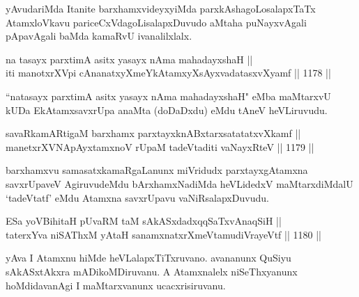 \begin{artha}
yAvudariMda Itanite barxhamxvideyxyiMda parxkAshagoLosalapxTaTx AtamxloVkavu pariceCxVdagoLisalapxDuvudo aMtaha puNayxvAgali pApavAgali baMda kamaRvU ivanalilxlalx.
\end{artha}


\begin{shl}
na tasayx parxtimA asitx yasayx nAma mahadayxshaH || \\
iti manotxrXV\s pi cA\s \s nanatxyXmeYkAtamxyXsAyxvadatasxvXyamf \hfill || 1178 ||  
\end{shl}

\begin{artha}
``natasayx parxtimA asitx yasayx nAma mahadayxshaH" eMba maMtarxvU kUDa EkAtamxsavxrUpa anaMta (doDaDxdu) eMdu tAneV heVLiruvudu.
\end{artha}

\begin{shl}
savaRkamARtigaM barxhamx parxtayxknABxtarxsatatatxvXkamf || \\
manetxrXVNApAyxtamxnoV rUpaM tadeVtaditi vaNayxRteV \hfill || 1179 ||  
\end{shl}

\begin{artha}
barxhamxvu samasatxkamaRgaLanunx miVridudx parxtayxgAtamxna savxrUpaveV AgiruvudeMdu bArxhamxNadiMda heVLidedxV maMtarxdiMdalU `tadeVtatf' eMdu Atamxna savxrUpavu vaNiRsalapxDuvudu.
\end{artha}



\begin{shl}
ESa yoV\s BihitaH pUvaRM taM sAkASxdadxqqSaTxvAnaqSiH || \\
taterxYva niSAThxM yAtaH sanamxnatxrXmeVtamudiVrayeVtf \hfill || 1180 ||  
\end{shl}

\begin{artha}
yAva I Atamxnu hiMde heVLalapxTiTxruvano. avananunx QuSiyu sAkASxtAkxra mADikoMDiruvanu. A Atamxnalelx niSeThxyanunx hoMdidavanAgi I maMtarxvanunx ucacxrisiruvanu.
\end{artha}


